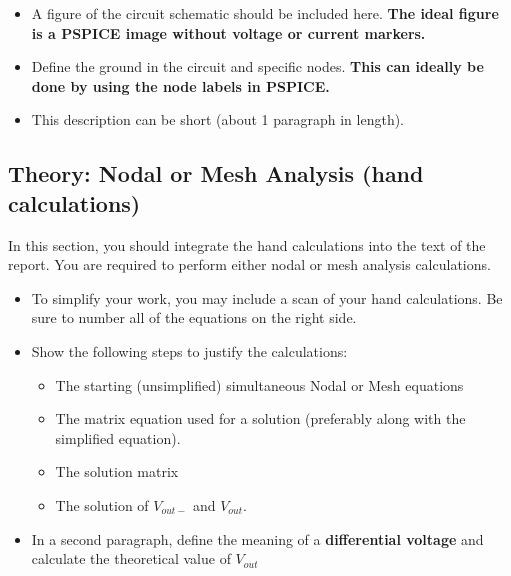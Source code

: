 \documentclass[11pt]{article}
\begin{document}
\begin{itemize}
	\item A figure of the circuit schematic should be included here.  \textbf{The ideal figure is a PSPICE image without voltage or current markers.}
	\item Define the ground in the circuit and specific nodes. \textbf{This can ideally be done by using the node labels in PSPICE.}
	\item This description can be short (about 1 paragraph in length).
\end{itemize}
\subsection{Theory: Nodal or Mesh Analysis (hand calculations)}
In this section, you should integrate the hand calculations into the text of the report.  You are required to perform either nodal or mesh analysis calculations. 
\begin{itemize}
	\item To simplify your work, you may include a scan of your hand calculations.  Be sure to number all of the equations on the right side.
	\item Show the following steps to justify the calculations:
		 \begin{itemize}
		 	\item The starting (unsimplified) simultaneous Nodal or Mesh equations
		 	\item The matrix equation used for a solution (preferably along with the simplified equation).
		 	\item The solution matrix 
		 	\item The solution of $V_{out-}$ and $V_{out}$.
		 \end{itemize}
	\item In a second paragraph, define the meaning of a \textbf{differential voltage} and calculate the theoretical value of $V_{out}$
\end{itemize}
\end{document}
